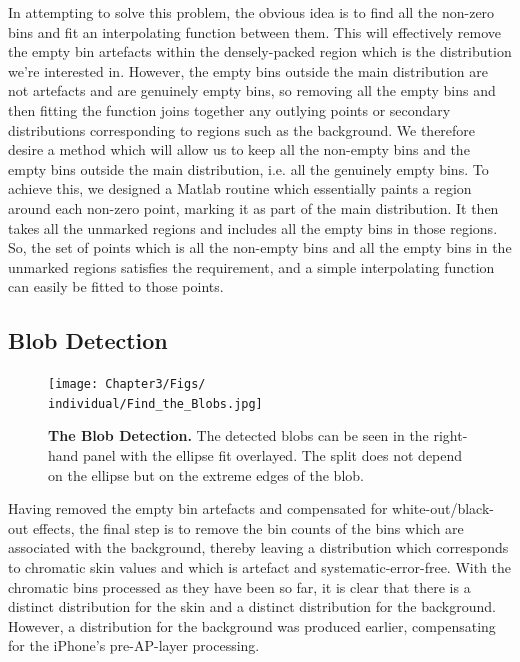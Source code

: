 In attempting to solve this problem, the obvious idea is to find all the non-zero bins and fit an interpolating function between them. This will effectively remove the empty bin artefacts within the densely-packed region which is the distribution we're interested in. However, the empty bins outside the main distribution are not artefacts and are genuinely empty bins, so removing all the empty bins and then fitting the function joins together any outlying points or secondary distributions corresponding to regions such as the background. We therefore desire a method which will allow us to keep all the non-empty bins and the empty bins outside the main distribution, i.e. all the genuinely empty bins. To achieve this, we designed a Matlab routine which essentially paints a region around each non-zero point, marking it as part of the main distribution. It then takes all the unmarked regions and includes all the empty bins in those regions. So, the set of points which is all the non-empty bins and all the empty bins in the unmarked regions satisfies the requirement, and a simple interpolating function can easily be fitted to those points.





\subsection{Blob Detection}\label{sec:BlobDetection}

\begin{figure}[h!]
  \centering
    \texttt{[image: Chapter3/Figs/\\individual/Find\_the\_Blobs.jpg]}
        \caption{\textbf{The Blob Detection.} The detected blobs can be seen in the right-hand panel with the ellipse fit overlayed. The split does not depend on the ellipse but on the extreme edges of the blob.} \label{fig:Find_the_Blobs}
    \end{figure}
    
Having removed the empty bin artefacts and compensated for white-out/black-out effects, the final step is to remove the bin counts of the bins which are associated with the background, thereby leaving a distribution which corresponds to chromatic skin values and which is artefact and systematic-error-free. With the chromatic bins processed as they have been so far, it is clear that there is a distinct distribution for the skin and a distinct distribution for the background. However, a distribution for the background was produced earlier, compensating for the iPhone's pre-AP-layer processing. 


